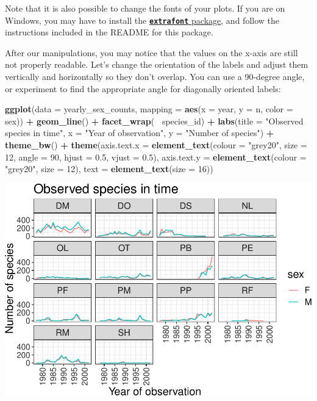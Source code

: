 \documentclass[]{book}
\newenvironment{Shaded}{\begin{snugshade}}{\end{snugshade}}
\newcommand{\KeywordTok}[1]{\textcolor[rgb]{0.13,0.29,0.53}{\textbf{#1}}}
\newcommand{\DataTypeTok}[1]{\textcolor[rgb]{0.13,0.29,0.53}{#1}}
\newcommand{\DecValTok}[1]{\textcolor[rgb]{0.00,0.00,0.81}{#1}}
\newcommand{\FloatTok}[1]{\textcolor[rgb]{0.00,0.00,0.81}{#1}}
\newcommand{\StringTok}[1]{\textcolor[rgb]{0.31,0.60,0.02}{#1}}
\newcommand{\OperatorTok}[1]{\textcolor[rgb]{0.81,0.36,0.00}{\textbf{#1}}}
\newcommand{\NormalTok}[1]{#1}
\begin{document}
Note that it is also possible to change the fonts of your plots. If you
are on Windows, you may have to install the
\href{https://github.com/wch/extrafont}{\textbf{\texttt{extrafont}}
package}, and follow the instructions included in the README for this
package.

After our manipulations, you may notice that the values on the x-axis
are still not properly readable. Let's change the orientation of the
labels and adjust them vertically and horizontally so they don't
overlap. You can use a 90-degree angle, or experiment to find the
appropriate angle for diagonally oriented labels:

\begin{Shaded}
\begin{Highlighting}[]
\KeywordTok{ggplot}\NormalTok{(}\DataTypeTok{data =}\NormalTok{ yearly_sex_counts, }\DataTypeTok{mapping =} \KeywordTok{aes}\NormalTok{(}\DataTypeTok{x =}\NormalTok{ year, }\DataTypeTok{y =}\NormalTok{ n, }\DataTypeTok{color =}\NormalTok{ sex)) }\OperatorTok{+}
\StringTok{    }\KeywordTok{geom_line}\NormalTok{() }\OperatorTok{+}
\StringTok{    }\KeywordTok{facet_wrap}\NormalTok{(}\OperatorTok{~}\StringTok{ }\NormalTok{species_id) }\OperatorTok{+}
\StringTok{    }\KeywordTok{labs}\NormalTok{(}\DataTypeTok{title =} \StringTok{"Observed species in time"}\NormalTok{,}
        \DataTypeTok{x =} \StringTok{"Year of observation"}\NormalTok{,}
        \DataTypeTok{y =} \StringTok{"Number of species"}\NormalTok{) }\OperatorTok{+}
\StringTok{    }\KeywordTok{theme_bw}\NormalTok{() }\OperatorTok{+}
\StringTok{    }\KeywordTok{theme}\NormalTok{(}\DataTypeTok{axis.text.x =} \KeywordTok{element_text}\NormalTok{(}\DataTypeTok{colour =} \StringTok{"grey20"}\NormalTok{, }\DataTypeTok{size =} \DecValTok{12}\NormalTok{, }\DataTypeTok{angle =} \DecValTok{90}\NormalTok{, }\DataTypeTok{hjust =} \FloatTok{0.5}\NormalTok{, }\DataTypeTok{vjust =} \FloatTok{0.5}\NormalTok{),}
                        \DataTypeTok{axis.text.y =} \KeywordTok{element_text}\NormalTok{(}\DataTypeTok{colour =} \StringTok{"grey20"}\NormalTok{, }\DataTypeTok{size =} \DecValTok{12}\NormalTok{),}
          \DataTypeTok{text =} \KeywordTok{element_text}\NormalTok{(}\DataTypeTok{size =} \DecValTok{16}\NormalTok{))}
\end{Highlighting}
\end{Shaded}

\includegraphics{img/R-ecology-number-species-year-with-theme-1.pdf}
\end{document}
